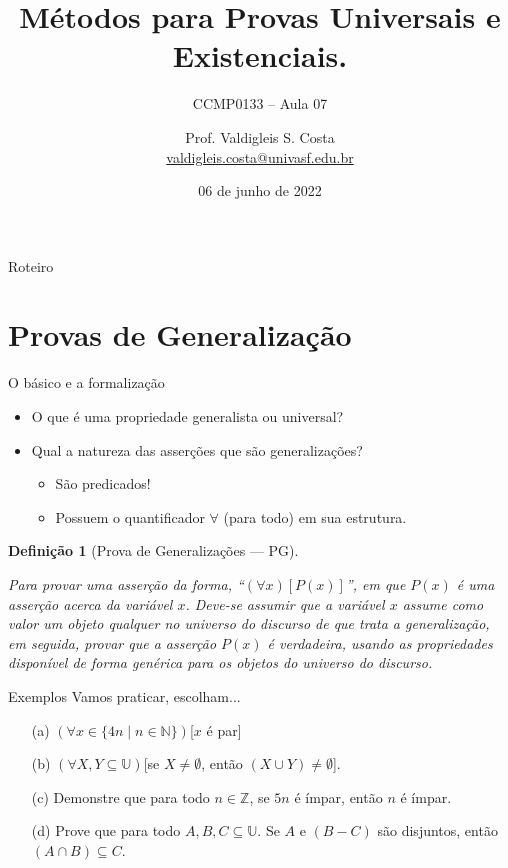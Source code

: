 \documentclass[aspectratio=169]{beamer}
\title{Métodos para Provas Universais e Existenciais.}
\subtitle{CCMP0133 -- Aula 07}
\date{06 de junho de 2022}
\author{Prof. Valdigleis S. Costa\\\url{valdigleis.costa@univasf.edu.br}}
\institute{Universidade Federal do Vale do São Francisco\\Colegiado de Ciência da Computação\\\textit{Campus} Salgueiro-PE}
\newtheorem{defi}{Definição}
\begin{document}
	\maketitle
	
	\begin{frame}{Roteiro}
		\tableofcontents
	\end{frame}

	\section{Provas de Generalização}
	
	\begin{frame}{O básico e a formalização}
		\begin{itemize}
			\item O que é uma propriedade generalista ou universal?\pause
			\item Qual a natureza das asserções que são generalizações?\pause
			\begin{itemize}
				\item São predicados!
				\item Possuem o quantificador $\forall$ (para todo) em sua estrutura.
			\end{itemize} 
		\end{itemize}
		\pause
		\begin{defi}[Prova de Generalizações --- PG]
			\
			
			Para provar uma asserção da forma, ``$(\forall x)[P(x)]$'', em que $P(x)$ é uma asserção acerca da variável $x$. Deve-se assumir que a variável $x$ assume como valor um objeto qualquer no universo do discurso de que trata a  generalização, em seguida, provar que a asserção $P(x)$ é verdadeira, usando as propriedades disponível de forma genérica para os objetos do universo do discurso.
		\end{defi}
	\end{frame}

	\begin{frame}{Exemplos}
		Vamos praticar, escolham...
		\begin{itemize}
			\item[(a)] $(\forall x \in \{4n \mid n \in \mathbb{N} \})$[$x$ é par]
			\item[(b)] $(\forall X, Y \subseteq \mathbb{U})$[se $X \neq \emptyset$, então $(X \cup Y) \neq \emptyset$].
			\item[(c)] Demonstre que para todo $n \in \mathbb{Z}$, se $5n$ é ímpar, então $n$ é ímpar.
			\item[(d)] Prove que para todo $A, B, C  \subseteq \mathbb{U}$. Se $A$ e $(B - C)$ são disjuntos, então $(A \cap B) \subseteq C$.
		\end{itemize}
	\end{frame}
\end{document}
